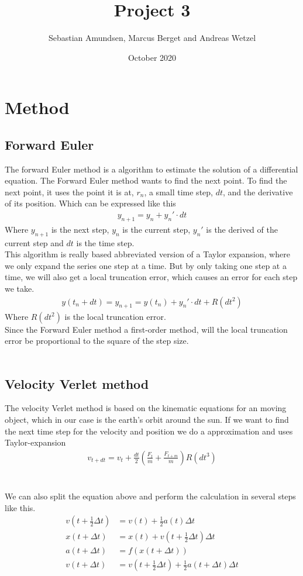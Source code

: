 \documentclass[norsk,a4paper,12pt]{article}
\title{Project 3}
\author{Sebastian Amundsen, Marcus Berget and Andreas Wetzel}
\date{October 2020}
\begin{document}
\maketitle

\section{Method}
\subsection{Forward Euler}
The forward Euler method is a algorithm to estimate the solution of a differential equation. The Forward Euler method wants to find the next point. To find the next point, it uses the point it is at, $r_n$, a small time step, $dt$, and the derivative of its position. Which can be expressed like this
\begin{align}
    y_{n+1}=y_n + y_n'\cdot dt
\end{align}
Where $y_{n+1}$ is the next step, $y_n$ is the current step, $y_n'$ is the derived of the current step and $dt$ is the time step.\\
This algorithm is really based abbreviated version of a Taylor expansion, where we only expand the series one step at a time. But by only taking one step at a time, we will also get a local truncation error, which causes an error for each step we take. \begin{align}
    y(t_n+dt)=y_{n+1}=y(t_n)+y_n'\cdot dt + R(dt^2)
\end{align} 
Where $R(dt^2)$ is the local truncation error. \\
Since the Forward Euler method a first-order method, will the local truncation error be proportional to the square of the step size. 
\\
\\
\subsection{Velocity Verlet method}
The velocity Verlet method is based on the kinematic equations for an moving object, which in our case is the earth's orbit around the sun. If we want to find the next time step for the velocity and position we do a approximation and uses Taylor-expansion   
\begin{align}
    v_{t+dt}=v_t +\frac{dt}{2}(\frac{F_t}{m}+\frac{F_{t+m}}{m}) R(dt^3)
\end{align}\\
\\
We can also split the equation above and perform the calculation in several steps like this.
\begin{align*}
    v(t+\frac{1}{2}\Delta t)&=v(t)+\frac{1}{2}a(t)\Delta t\\
    x(t+\Delta t)&=x(t)+v(t+\frac{1}{2}\Delta t)\Delta t\\
    a(t+\Delta t)&=f(x(t+\Delta t))\\
    v(t+\Delta t)&=v(t+\frac{1}{2}\Delta t)+\frac{1}{2}a(t+\Delta t)\Delta t
\end{align*}
\end{document}
